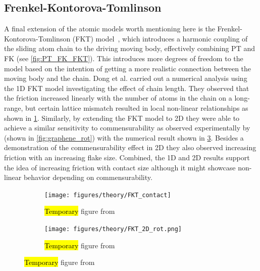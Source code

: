 \subsection{Frenkel-Kontorova-Tomlinson}
A final extension of the atomic models worth mentioning here is the
Frenkel-Kontorova-Tomlinson (\acrshort{FKT}) model~\cite{weiss_dry_1997}, which
introduces a harmonic coupling of the sliding atom chain to the driving moving
body, effectively combining \acrshort{PT} and \acrshort{FK} (see \cref{fig:PT_FK_FKT}). This introduces
more degrees of freedom to the model based on the intention of getting a more realistic connection between the moving body and the chain. Dong et al. carried out a numerical analysis using the 1D \acrshort{FKT} model investigating the effect of chain length. They observed that the friction increased linearly with the number of atoms in the chain on a long-range, but certain lattice mismatch resulted in local non-linear relationships as shown in \cref{fig:FKT_contact}. Similarly, by extending the \acrshort{FKT} model to 2D they were able to achieve a similar sensitivity to commensurability as observed experimentally by~\cite{DIENWIEBEL2005197} (shown in
\cref{fig:graphene_rot}) with the numerical result shown in \cref{fig:FKT_2D_rot}. Besides a demonstration of the commensurability effect in 2D they also observed increasing friction with an increasing flake size. Combined, the 1D and 2D results support the idea of increasing friction with contact size although it might showcase non-linear behavior depending on commensurability.


\begin{figure}[H]
  \centering
  \begin{subfigure}[t]{0.49\textwidth}
      \centering
      \texttt{[image: figures/theory/FKT\_contact]}
      \label{fig:FKT_contact}
      \caption{\hl{Temporary} figure from~\cite{Yalin_2011} }
  \end{subfigure}
  \hfill
  \begin{subfigure}[t]{0.49\textwidth}
      \centering
      \texttt{[image: figures/theory/FKT\_2D\_rot.png]}
      \label{fig:FKT_2D_rot}
      \caption{\hl{Temporary} figure from~\cite{Yalin_2011} }
  \end{subfigure}
  \hfill
\end{figure}



